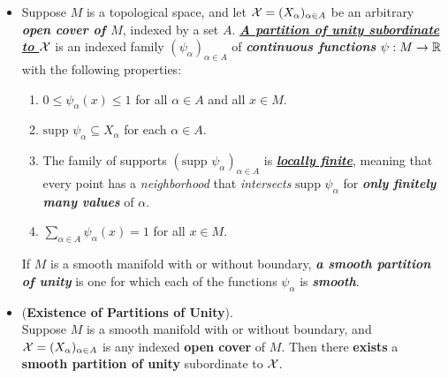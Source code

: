 \documentclass[11pt]{article}
\begin{document}
\begin{itemize}
\item \begin{definition}
Suppose $M$ is a topological space, and let ${\mathcal X} = (X_{\alpha})_{\alpha \in A}$ be an arbitrary \emph{\textbf{open cover of $M$}}, indexed by a set $A$. \underline{\emph{\textbf{A partition of unity subordinate to ${\mathcal X}$}}} is an indexed family $(\psi_{\alpha})_{\alpha \in A}$ of \emph{\textbf{continuous functions}} $\psi: M \rightarrow {\mathbb R}$ with the following properties:
\begin{enumerate}
\item $0\le \psi_{\alpha}(x) \le 1$ for all $\alpha \in A$ and all $x \in M$.
\item \underline{$\text{supp }\psi_{\alpha} \subseteq X_{\alpha}$} for each $\alpha \in A$.
\item The family of supports $(\text{supp }\psi_{\alpha})_{\alpha \in A}$ is \underline{\emph{\textbf{locally finite}}}, meaning that every point has a \emph{neighborhood} that \emph{intersects} $\text{supp }\psi_{\alpha}$ for \emph{\textbf{only finitely many values}} of $\alpha$.
\item \underline{$\sum_{\alpha \in A}\psi_{\alpha}(x) = 1$} for all $x \in M$.
\end{enumerate}

If $M$ is a smooth manifold with or without boundary, \emph{\textbf{a smooth partition of unity}} is one for which each of the functions $\psi_{\alpha}$ is \emph{\textbf{smooth}}.
\end{definition}

\item \begin{theorem} (\textbf{Existence of Partitions of Unity}). \citep{lee2003introduction} \\
Suppose $M$ is a smooth manifold with or without boundary, and ${\mathcal X} = (X_{\alpha})_{\alpha \in A}$ is any indexed \textbf{open cover} of $M$.
Then there \textbf{exists} a \textbf{smooth partition of unity} subordinate to ${\mathcal X}$.
\end{theorem}
\end{itemize}
\end{document}
